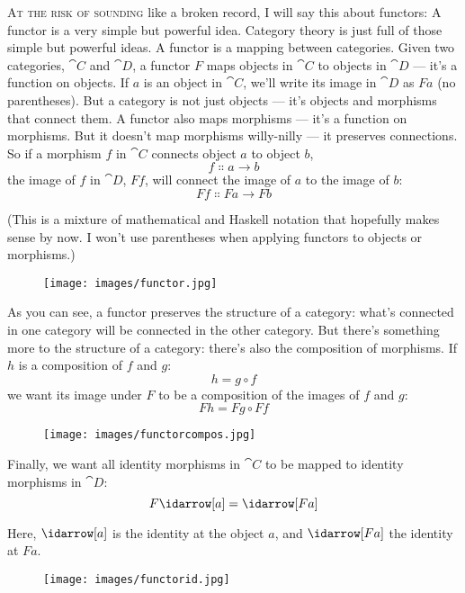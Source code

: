 
\lettrine[lhang=0.17]{A}{t the risk of sounding} like a broken record, I will say this about
functors: A functor is a very simple but powerful idea. Category theory
is just full of those simple but powerful ideas. A functor is a mapping
between categories. Given two categories, $\cat{C}$ and $\cat{D}$, a functor $F$ maps
objects in $\cat{C}$ to objects in $\cat{D}$ --- it's a function on objects. If $a$
is an object in $\cat{C}$, we'll write its image in $\cat{D}$ as $F a$ (no
parentheses). But a category is not just objects --- it's objects and
morphisms that connect them. A functor also maps morphisms --- it's a
function on morphisms. But it doesn't map morphisms willy-nilly --- it
preserves connections. So if a morphism $f$ in $\cat{C}$ connects object
$a$ to object $b$,
\[f \Colon a \to b\]
the image of $f$ in $\cat{D}$, $F f$, will connect the image of
$a$ to the image of $b$:
\[F f \Colon F a \to F b\]

(This is a mixture of mathematical and Haskell notation that hopefully
makes sense by now. I won't use parentheses when applying functors to
objects or morphisms.)

\begin{figure}[H]
  \centering\texttt{[image: images/functor.jpg]}
\end{figure}

\noindent
As you can see, a
functor preserves the structure of a category: what's connected in one
category will be connected in the other category. But there's something
more to the structure of a category: there's also the composition of
morphisms. If $h$ is a composition of $f$ and $g$:
\[h = g \circ f\]
we want its image under $F$ to be a composition of the images of $f$
and $g$:
\[F h = F g \circ F f\]

\begin{figure}[H]
  \centering
  \texttt{[image: images/functorcompos.jpg]}
\end{figure}

\noindent
Finally, we want all identity morphisms in $\cat{C}$ to be mapped to identity morphisms in
$\cat{D}$:
\[F \idarrow[a] = \idarrow[F a]\]

\noindent
Here, $\idarrow[a]$ is the identity at the object $a$,
and $\idarrow[F a]$ the identity at $F a$.

\begin{figure}[H]
  \centering
  \texttt{[image: images/functorid.jpg]}
\end{figure}

